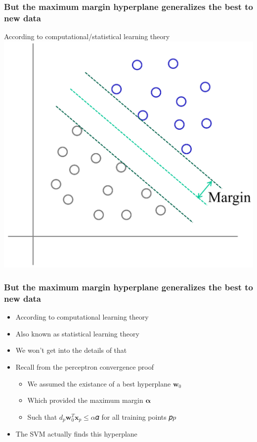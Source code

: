 \documentclass[12pt,notes,mathserif]{beamer}
\begin{document}
\begin{frame}[c]
\frametitle{But the maximum margin hyperplane generalizes the best to new data}
\begin{center}
According to computational/statistical learning theory\\
\includegraphics[width=0.6\linewidth]{fig8/lec86.jpg}
\end{center}
\end{frame}


\begin{frame}[c]
\frametitle{But the maximum margin hyperplane generalizes the best to new data}
\begin{itemize}
\item According to computational learning theory
\item Also known as statistical learning theory
\item We won't get into the details of that
\item Recall from the perceptron convergence proof
		\begin{itemize}
		\item We assumed the existance of a best hyperplane $\bm{w}_0$
		\item Which provided the maximum margin $\bm{\alpha}$
		\item Such that $d_p\bm{w}_0^T\bm{x}_p\leqslant{}\alpha$𝛼 for all training points 𝑝$p$
		\end{itemize}
\item The SVM actually finds this hyperplane
\end{itemize}

\end{frame}
\end{document}
